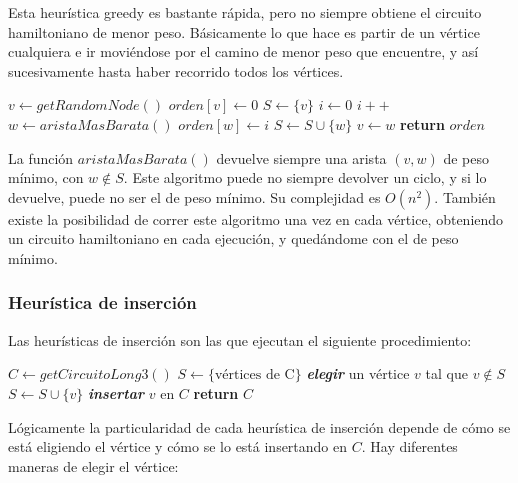 Esta heur\'istica greedy es bastante r\'apida, pero no siempre obtiene el circuito hamiltoniano de menor peso. B\'asicamente lo que hace es partir de un v\'ertice cualquiera e ir movi\'endose por el camino de menor peso que encuentre, y as\'i sucesivamente hasta haber recorrido todos los v\'ertices.

\begin{algorithm}
\begin{algorithmic}[1]
  \State $v \gets getRandomNode()$
  \State $orden[v] \gets 0$
  \State $S \gets \{v\}$
  \State $i \gets 0$
    \State $i++$
    \State $w \gets aristaMasBarata()$
    \State $orden[w] \gets i$
    \State $S \gets S \cup \{ w \}$
    \State $v \gets w$
  \EndWhile
  \State \textbf{return} $orden$
\EndFunction
\end{algorithmic}
\end{algorithm}

La funci\'on $aristaMasBarata()$ devuelve siempre una arista $(v,w)$ de peso m\'inimo, con $w \not\in S$. Este algoritmo puede no siempre devolver un ciclo, y si lo devuelve, puede no ser el de peso m\'inimo. Su complejidad es $O(n^2)$. Tambi\'en existe la posibilidad de correr este algoritmo una vez en cada v\'ertice, obteniendo un circuito hamiltoniano en cada ejecuci\'on, y qued\'andome con el de peso m\'inimo.

\newpage
\subsubsection*{Heur\'istica de inserci\'on}

Las heur\'isticas de inserci\'on son las que ejecutan el siguiente procedimiento:

\begin{algorithm}
\begin{algorithmic}[1]
\State $C \gets getCircuitoLong3()$
\State $S \gets \{ \textrm{v\'ertices de C} \}$
  \State \textbf{\emph{elegir}} un v\'ertice $v$ tal que $v \not\in S$
  \State $S \gets S \cup \{ v \}$
  \State \textbf{\emph{insertar}} $v$ en $C$
\EndWhile
\State \textbf{return} $C$
\end{algorithmic}
\end{algorithm}

L\'ogicamente la particularidad de cada heur\'istica de inserci\'on depende de c\'omo se est\'a eligiendo el v\'ertice y c\'omo se lo est\'a insertando en $C$. Hay diferentes maneras de elegir el v\'ertice:


